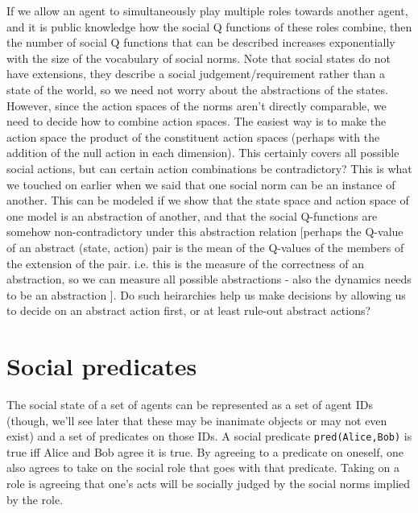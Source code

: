 \documentclass[a4paper]{article}
\begin{document}
If we allow an agent to simultaneously play multiple roles towards another agent, and it is public knowledge how the social Q functions of these roles combine, then the number of social Q functions that can be described increases exponentially with the size of the vocabulary of social norms. Note that social states do not have extensions, they describe a social judgement/requirement rather than a state of the world, so we need not worry about the abstractions of the states. However, since the action spaces of the norms aren't directly comparable, we need to decide how to combine action spaces. The easiest way is to make the action space the product of the constituent action spaces (perhaps with the addition of the null action in each dimension). This certainly covers all possible social actions, but can certain action combinations be contradictory? This is what we touched on earlier when we said that one social norm can be an instance of another. This can be modeled if we show that the state space and action space of one model is an abstraction of another, and that the social Q-functions are somehow non-contradictory under this abstraction relation [perhaps the Q-value of an abstract (state, action) pair is the mean of the Q-values of the members of the extension of the pair. i.e. this is the measure of the correctness of an abstraction, so we can measure all possible abstractions - also the dynamics needs to be an abstraction ]. Do such heirarchies help us make decisions by allowing us to decide on an abstract action first, or at least rule-out abstract actions?

\section{Social predicates}

The social state of a set of agents can be represented as a set of agent IDs (though, we'll see later that these may be inanimate objects or may not even exist) and a set of predicates on those IDs. A social predicate \texttt{pred(Alice,Bob)} is true iff Alice and Bob agree it is true. By agreeing to a predicate on oneself, one also agrees to take on the social role that goes with that predicate. Taking on a role is agreeing that one's acts will be socially judged by the social norms implied by the role.
\end{document}
